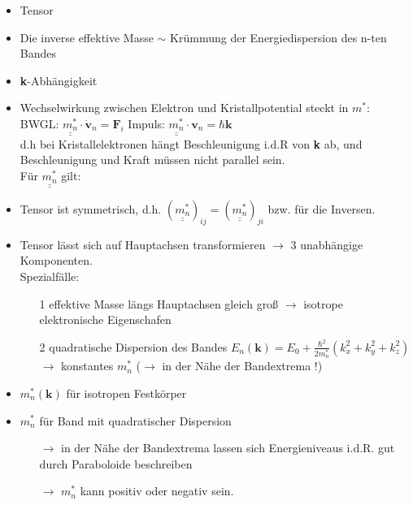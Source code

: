 \begin{itemize}
          \begin{itemize}
              \item Tensor
              \item Die inverse effektive Masse $\sim$ Krümmung der Energiedispersion des n-ten Bandes
              \item \textbf{k}-Abhängigkeit
              \item Wechselwirkung zwischen Elektron und Kristallpotential steckt in $m^*$: \\
                    BWGL: $\underline{\underline{m_n^*}} \cdot \dot{\textbf{v}}_n = \textbf{F}_i$ Impuls: $\underline{\underline{m_n^*}} \cdot \textbf{v}_n = \hbar \textbf{k}$ \\
                    d.h bei Kristallelektronen hängt Beschleunigung i.d.R von \textbf{k} ab, und Beschleunigung und Kraft müssen nicht parallel sein. \\
                    Für $\underline{\underline{m_n^*}}$ gilt: \\
              \item Tensor ist symmetrisch, d.h. $(\underline{\underline{m_n^*}})_{ij} = (\underline{\underline{m_n^*}})_{ji}$ bzw. für die Inversen.
              \item Tensor lässt sich auf Hauptachsen transformieren $\rightarrow$ 3 unabhängige Komponenten.\\
                    Spezialfälle:
                    \begin{itemize}
                        \item[1] effektive Masse längs Hauptachsen gleich groß $\rightarrow$ isotrope elektronische Eigenschafen
                        \item[2] quadratische Dispersion des Bandes $E_n(\textbf{k}) = E_0 + \frac{\hbar^2}{2m_n^*}(k_x^2 + k_y^2 + k_z^2)$ $\rightarrow$  konstantes $m_n^*$ ($\rightarrow$  in der Nähe der Bandextrema !)
                    \end{itemize}
              \item $m_n^* (\textbf{k})$ für isotropen Festkörper
              \item $m_n^*$ für Band mit quadratischer Dispersion
                    \begin{itemize}
                        \item[$\rightarrow$] in der Nähe der Bandextrema lassen sich Energieniveaus i.d.R. gut durch Paraboloide beschreiben
                        \item[$\rightarrow$] $m_n^*$ kann positiv oder negativ sein.
                    \end{itemize}
          \end{itemize}
\end{itemize}



